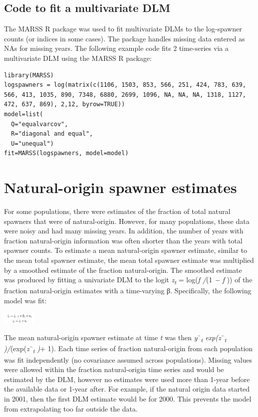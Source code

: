\documentclass[
  letterpaper,
  oneside,
  open=any]{scrbook}
\begin{document}
\hypertarget{code-to-fit-a-multivariate-dlm}{%
\subsection{Code to fit a multivariate
DLM}\label{code-to-fit-a-multivariate-dlm}}

The MARSS R package was used to fit multivariate DLMs to the log-spawner
counts (or indices in some cases). The package handles missing data
entered as NAs for missing years. The following example code fits 2
time-series via a multivariate DLM using the MARSS R package:

\begin{verbatim}
library(MARSS)
logspawners = log(matrix(c(1106, 1503, 853, 566, 251, 424, 783, 639, 566, 413, 1035, 890, 7348, 6880, 2699, 1096, NA, NA, NA, 1318, 1127, 472, 637, 869), 2,12, byrow=TRUE))
model=list(
  Q="equalvarcov", 
  R="diagonal and equal",
  U="unequal")
fit=MARSS(logspawners, model=model)
\end{verbatim}

\hypertarget{natural-origin-spawner-estimates}{%
\section{Natural-origin spawner
estimates}\label{natural-origin-spawner-estimates}}

For some populations, there were estimates of the fraction of total
natural spawners that were of natural-origin. However, for many
populations, these data were noisy and had many missing years. In
addition, the number of years with fraction natural-origin information
was often shorter than the years with total spawner counts. To estimate
a mean natural-origin spawner estimate, similar to the mean total
spawner estimate, the mean total spawner estimate was multiplied by a
smoothed estimate of the fraction natural-origin. The smoothed estimate
was produced by fitting a univariate DLM to the logit
\emph{z\textsubscript{t}} = log(\emph{f /}(1 \emph{− f} )) of the
fraction natural-origin estimates with a time-varying β. Specifically,
the following model was fit:

\includegraphics[width=0.63in,height=\textheight]{content/../media/image6.png}

The mean natural-origin spawner estimate at time \emph{t} was then
\emph{y}¯\emph{\textsubscript{t} exp(z}¯\emph{\textsubscript{t}
)/}(exp(\emph{z}¯\emph{\textsubscript{t} )}+ 1). Each time series of
fraction natural-origin from each population was fit independently (no
covariance assumed across populations). Missing values were allowed
within the fraction natural-origin time series and would be estimated by
the DLM, however no estimates were used more than 1-year before the
available data or 1-year after. For example, if the natural origin data
started in 2001, then the first DLM estimate would be for 2000. This
prevents the model from extrapolating too far outside the data.
\end{document}
